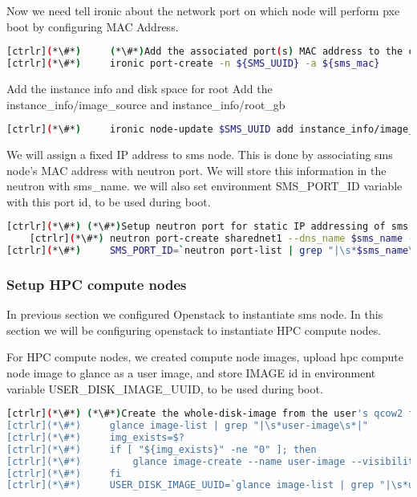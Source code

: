 Now we need tell ironic about the network port on which node will perform pxe boot by configuring MAC Address. 

	\begin{lstlisting}[language=bash,keywords={}]
[ctrlr](*\#*)     (*\#*)Add the associated port(s) MAC address to the created node(s)
[ctrlr](*\#*)     ironic port-create -n ${SMS_UUID} -a ${sms_mac}
	\end{lstlisting}

Add the instance info and disk space for root 
Add the instance\_info/image\_source and instance\_info/root\_gb
    
    \begin{lstlisting}[language=bash,keywords={}]
[ctrlr](*\#*)     ironic node-update $SMS_UUID add instance_info/image_source=${SMS_DISK_IMAGE_UUID} instance_info/root_gb=50
	\end{lstlisting}


We will assign a fixed IP address to sms node. This is done by associating sms node’s MAC address with neutron port. We will store this information in the neutron with sms\_name. we will also set environment SMS\_PORT\_ID variable with this port id, to be used during boot.
    
    \begin{lstlisting}[language=bash,keywords={}]
    [ctrlr](*\#*) (*\#*)Setup neutron port for static IP addressing of sms node, this is an optional part
    [ctrlr](*\#*) neutron port-create sharednet1 --dns_name $sms_name --fixed-ip ip_address=$sms_ip --name $sms_name --mac-address $sms_mac
[ctrlr](*\#*)     SMS_PORT_ID=`neutron port-list | grep "|\s*$sms_name\s*|" | awk '{print $2}'`
	\end{lstlisting}


\subsubsection{Setup HPC compute nodes}

In previous section we configured Openstack to instantiate sms node. In this section we will be configuring openstack to instantiate HPC compute nodes.

For HPC compute nodes, we created compute node images, upload hpc compute node image to glance as a user image, and store IMAGE id in environment variable USER\_DISK\_IMAGE\_UUID, to be used during boot.

\begin{lstlisting}[language=bash,keywords={}]
[ctrlr](*\#*) (*\#*)Create the whole-disk-image from the user's qcow2 file
[ctrlr](*\#*)     glance image-list | grep "|\s*user-image\s*|"
[ctrlr](*\#*)     img_exists=$?
[ctrlr](*\#*)     if [ "${img_exists}" -ne "0" ]; then
[ctrlr](*\#*)         glance image-create --name user-image --visibility public --disk-format qcow2 --container-format bare < ${chpc_image_user}
[ctrlr](*\#*)     fi
[ctrlr](*\#*)     USER_DISK_IMAGE_UUID=`glance image-list | grep "|\s*user-image\s*|" | awk '{print $2}'`
\end{lstlisting}



